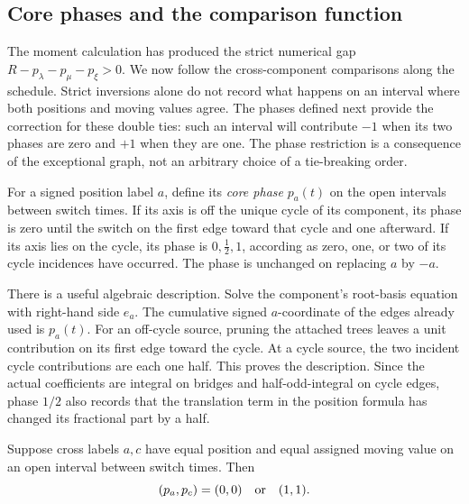 \subsection{Core phases and the comparison function}

The moment calculation has produced the strict numerical gap
\(R-p_\lambda-p_\mu-p_\xi>0\). We now follow the cross-component
comparisons along the schedule. Strict inversions alone do not record
what happens on an interval where both positions and moving values
agree. The phases defined next provide the correction for these
double ties: such an interval will contribute \(-1\) when its two
phases are zero and \(+1\) when they are one.  The phase restriction
is a consequence of the exceptional graph, not an arbitrary choice
of a tie-breaking order.

For a signed position label \(a\), define its \emph{core phase}
\(p_a(t)\) on the open intervals between switch times.  If its axis is
off the unique cycle of its component, its phase is zero until the
switch on the first edge toward that cycle and one afterward.  If its
axis lies on the cycle, its phase is \(0,\tfrac12,1\), according as
zero, one, or two of its cycle incidences have occurred.  The phase is
unchanged on replacing \(a\) by \(-a\).

There is a useful algebraic description.  Solve the component's
root-basis equation with right-hand side \(e_a\).  The cumulative
signed \(a\)-coordinate of the edges already used is \(p_a(t)\).
For an off-cycle source, pruning the attached trees leaves a unit
contribution on its first edge toward the cycle.  At a cycle source,
the two incident cycle contributions are each one half.  This proves
the description.  Since the actual coefficients are integral on
bridges and half-odd-integral on cycle edges, phase \(1/2\) also records
that the translation term in the position formula has changed its
fractional part by a half.

\begin{lemma}[Plateaus]\label{lem:plateau}
Suppose cross labels \(a,c\) have equal position and equal assigned
moving value on an open interval between switch times.  Then
\begin{equation}\label{knot:plateau-phases}
 (p_a,p_c)=(0,0)\quad\hbox{or}\quad(1,1).
\end{equation}
\end{lemma}

